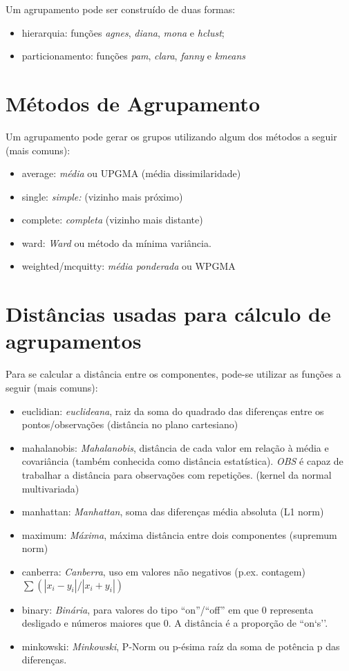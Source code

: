 \documentclass[]{book}
\providecommand{\tightlist}{%
  \setlength{\itemsep}{0pt}\setlength{\parskip}{0pt}}
\begin{document}
Um agrupamento pode ser construído de duas formas:

\begin{itemize}
\tightlist
\item
  hierarquia: funções \emph{agnes}, \emph{diana}, \emph{mona} e
  \emph{hclust};
\item
  particionamento: funções \emph{pam}, \emph{clara}, \emph{fanny} e
  \emph{kmeans}
\end{itemize}

\section{Métodos de Agrupamento}\label{AAmethod}

Um agrupamento pode gerar os grupos utilizando algum dos métodos a
seguir (mais comuns):

\begin{itemize}
\tightlist
\item
  average: \emph{média} ou UPGMA (média dissimilaridade)
\item
  single: \emph{simple:} (vizinho mais próximo)
\item
  complete: \emph{completa} (vizinho mais distante)
\item
  ward: \emph{Ward} ou método da mínima variância.
\item
  weighted/mcquitty: \emph{média ponderada} ou WPGMA
\end{itemize}

\section{Distâncias usadas para cálculo de agrupamentos}\label{AAdist}

Para se calcular a distância entre os componentes, pode-se utilizar as
funções a seguir (mais comuns):

\begin{itemize}
\tightlist
\item
  euclidian: \emph{euclideana}, raiz da soma do quadrado das diferenças
  entre os pontos/observações (distância no plano cartesiano)
\item
  mahalanobis: \emph{Mahalanobis}, distância de cada valor em relação à
  média e covariância (também conhecida como distância estatística).
  \emph{OBS} é capaz de trabalhar a distância para observações com
  repetições. (kernel da normal multivariada)
\item
  manhattan: \emph{Manhattan}, soma das diferenças média absoluta (L1
  norm)
\item
  maximum: \emph{Máxima}, máxima distância entre dois componentes
  (supremum norm)
\item
  canberra: \emph{Canberra}, uso em valores não negativos (p.ex.
  contagem) \(\sum(|x_i - y_i| / |x_i + y_i|)\)
\item
  binary: \emph{Binária}, para valores do tipo ``on''/``off'' em que
  \(0\) representa desligado e números maiores que \(0\). A distância é
  a proporção de ``on`s''.
\item
  minkowski: \emph{Minkowski}, P-Norm ou p-ésima raíz da soma de
  potência p das diferenças.
\end{itemize}
\end{document}
